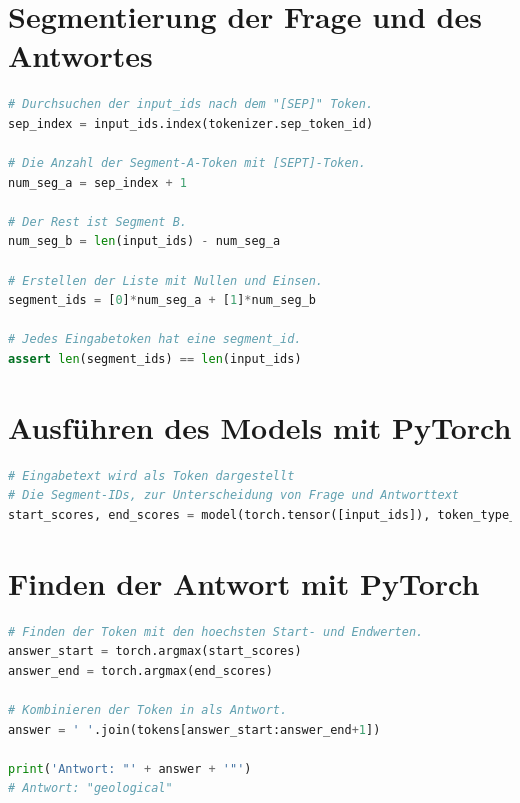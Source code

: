 \documentclass[
        ngerman,
        paper=a4,
        numbers=noendperiod,
]{scrreprt}
\begin{document}
\section{Segmentierung der Frage und des Antwortes}
\label{section:BERTSEG} %
\begin{lstlisting}[language=Python]
# Durchsuchen der input_ids nach dem "[SEP]" Token.
sep_index = input_ids.index(tokenizer.sep_token_id)

# Die Anzahl der Segment-A-Token mit [SEPT]-Token.
num_seg_a = sep_index + 1

# Der Rest ist Segment B.
num_seg_b = len(input_ids) - num_seg_a

# Erstellen der Liste mit Nullen und Einsen.
segment_ids = [0]*num_seg_a + [1]*num_seg_b

# Jedes Eingabetoken hat eine segment_id.
assert len(segment_ids) == len(input_ids)
\end{lstlisting}




\section{Ausführen des Models mit PyTorch}
\label{section:ANSW} %
\begin{lstlisting}[language=Python]
# Eingabetext wird als Token dargestellt
# Die Segment-IDs, zur Unterscheidung von Frage und Antworttext 
start_scores, end_scores = model(torch.tensor([input_ids]), token_type_ids=torch.tensor([segment_ids])) \end{lstlisting}



\section{Finden der Antwort mit PyTorch}
\label{section:END} %
\begin{lstlisting}[language=Python]
# Finden der Token mit den hoechsten Start- und Endwerten.
answer_start = torch.argmax(start_scores)
answer_end = torch.argmax(end_scores)

# Kombinieren der Token in als Antwort.
answer = ' '.join(tokens[answer_start:answer_end+1])

print('Antwort: "' + answer + '"') 
# Antwort: "geological"
\end{lstlisting}
\end{document}
